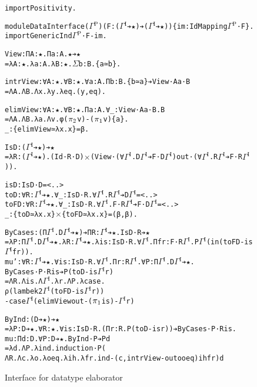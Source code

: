 \documentclass{article}
\newcommand{\splab}[1]{\ensuremath{^{\text{#1}}}}
\begin{document}
\begin{figure}[htbp!]
{
\begin{alltt}
import Positivity.

module DataInterface (\(\Gamma\splab{P}\)) (F: (\(\Gamma\splab{I}\) ➔ ★) ➔ (\(\Gamma\splab{I}\) ➔ ★)) \{im: IdMapping \(\Gamma\splab{P}\) ·F\}.
import GenericInd \(\Gamma\splab{P}\) ·F -im.

View: Π A: ★. Π a: A. ★ ➔ ★
= λ A: ★. λ a: A. λ B: ★. \(\Sigma\) b: B. \{a ≃ b\}.

intrView: ∀ A: ★. ∀ B: ★. ∀ a: A. Π b: B. \{b ≃ a\} ➔ View ·A a ·B
  = Λ A. Λ B. Λ x. λ y. λ eq. (y , eq).

elimView: ∀ A: ★. ∀ B: ★. Π a: A. ∀ _: View ·A a ·B. B
  = Λ A. Λ B. λ a. Λ v. φ (\(\pi\sb{2}\) v) - (\(\pi\sb{1}\) v) \{a\}.
_ : \{elimView ≃ λ x. x\} = β.

IsD: (\(\Gamma\splab{I}\) ➔ ★) ➔ ★
= λ R: (\(\Gamma\splab{I}\) ➔ ★). (Id ·R ·D) \(\times\) (View ·(∀ \(\Gamma\splab{I}\). D \(\Gamma\splab{I}\) ➔ F ·D \(\Gamma\splab{I}\)) out ·(∀ \(\Gamma\splab{I}\). R \(\Gamma\splab{I}\) ➔ F ·R \(\Gamma\splab{I}\))).

isD: IsD ·D = <..>
toD: ∀ R: \(\Gamma\splab{I}\) ➔ ★. ∀ _: IsD ·R. ∀ \(\Gamma\splab{I}\). R \(\Gamma\splab{I}\) ➔ D \(\Gamma\splab{I}\) = <..>
toFD: ∀ R: \(\Gamma\splab{I}\) ➔ ★. ∀ _: IsD ·R. ∀ \(\Gamma\splab{I}\). F ·R \(\Gamma\splab{I}\) ➔ F ·D \(\Gamma\splab{I}\) = <..>
_ : \{toD ≃ λ x. x\} \(\times\) \{toFD ≃ λ x. x\} = (β , β).

ByCases: (Π \(\Gamma\splab{I}\). D \(\Gamma\splab{I}\) ➔ ★) ➔ Π R: \(\Gamma\splab{I}\) ➔ ★. IsD ·R ➔ ★
  = λ P: Π \(\Gamma\splab{I}\). D \(\Gamma\splab{I}\) ➔ ★. λ R: \(\Gamma\splab{I}\) ➔ ★. λ is: IsD ·R. ∀ \(\Gamma\splab{I}\). Π fr: F ·R \(\Gamma\splab{I}\). P \(\Gamma\splab{I}\) (in (toFD -is \(\Gamma\splab{I}\) fr)).
mu': ∀ R: \(\Gamma\splab{I}\) ➔ ★. ∀ is: IsD ·R. ∀ \(\Gamma\splab{I}\). Π r: R \(\Gamma\splab{I}\). ∀ P: Π \(\Gamma\splab{I}\). D \(\Gamma\splab{I}\) ➔ ★.
  ByCases ·P ·R is ➔ P (toD -is \(\Gamma\splab{I}\) r)
= Λ R. Λ is. Λ \(\Gamma\splab{I}\). λ r. Λ P. λ case.
  ρ (lambek2 \(\Gamma\splab{I}\) (toFD -is \(\Gamma\splab{I}\) r))
- case \(\Gamma\splab{I}\) (elimView out -(\(\pi\sb{1}\) is) -\(\Gamma\splab{I}\) r)

ByInd: (D ➔ ★) ➔ ★
  = λ P: D ➔ ★. ∀ R: ★. ∀ is: IsD ·R. (Π r: R. P (toD -is r)) ➔ ByCases ·P ·R is.
mu: Π d: D. ∀ P: D ➔ ★. ByInd · P ➔ P d
  = λ d. Λ P. λ ind. induction ·P (
    Λ R. Λ c. λ o. λ oeq. λ ih. λ fr. ind -(c , intrView -out o oeq) ih fr) d
\end{alltt}
  }
  \caption{Interface for datatype elaborator}
  \label{fig:elab-interface}
\end{figure}
\end{document}
